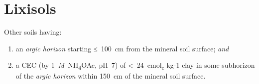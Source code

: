 \documentclass[
  letterpaper,
  DIV=11,
  numbers=noendperiod]{scrreprt}
\begin{document}
\hypertarget{key-lixisols}{%
\chapter{Lixisols}\label{key-lixisols}}

Other soils having:

\begin{enumerate}
\def\labelenumi{\arabic{enumi}.}
\item
  an \emph{argic horizon} starting ≤~100~cm from the mineral soil
  surface; \emph{and}
\item
  a CEC (by 1~\emph{M}~NH\textsubscript{4}OAc, pH~7) of
  \textless~24~cmol\textsubscript{c} kg-1 clay in some subhorizon of the
  \emph{argic horizon} within 150~cm of the mineral soil surface.
\end{enumerate}
\end{document}
